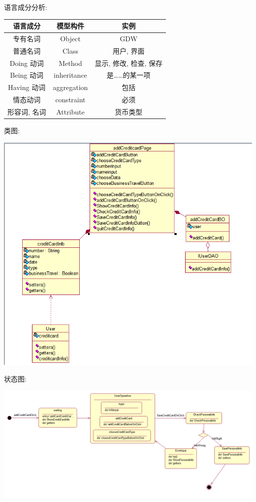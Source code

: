 \documentclass[11pt]{article}
\begin{document}
			语言成分分析:
			\begin{center}
			\begin{tabular}{|c|c|c|}
			\hline
			语言成分 & 模型构件 & 实例\\ \hline
			专有名词 & Object & GDW  \\ \hline
			普通名词 & Class & 用户, 界面 \\ \hline
			Doing 动词 & Method &  显示, 修改, 检查, 保存 \\ \hline
			Being 动词 & inheritance & 是……的某一项 \\ \hline
			Having 动词 & aggregation &  包括 \\ \hline
			情态动词 & constraint & 必须 \\ \hline
			形容词, 名词 & Attribute & 货币类型 \\ \hline
			\end{tabular}
			\end{center}
			
			类图: 
			\begin{center}
			\includegraphics[scale=0.42]{普通用户添加信用卡类图.png}
			\end{center}

			状态图: 
			\begin{center}
			\includegraphics[scale=0.42]{普通用户添加信用卡状态图.png}
			\end{center}
\end{document}
